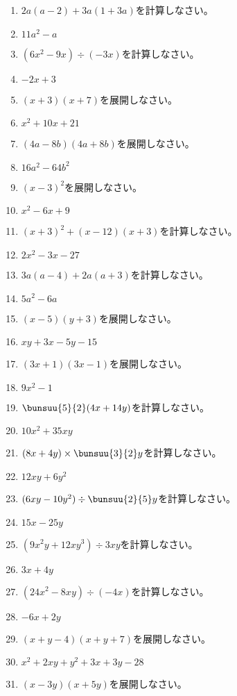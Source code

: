 \documentclass[uplatex,a4j,11pt]{jsreport}
\begin{document}
\begin{multicols}{2}
\begin{enumerate}
    \item $2a(a-2)+3a(1+3a)$\quad を計算しなさい。%
    \item $11a^2-a$
    \item $(6x^2-9x)\div (-3x)$\quad を計算しなさい。%
    \item $-2x+3$
    \item $(x+3)(x+7)$\quad を展開しなさい。%
    \item $x^2+10x+21$
    \item $(4a-8b)(4a+8b)$\quad を展開しなさい。%
    \item $16a^2-64b^2$
    \item $(x-3)^2$\quad を展開しなさい。%
    \item $x^2-6x+9$
    \item $(x+3)^2+(x-12)(x+3)$\quad を計算しなさい。%
    \item $2x^2-3x-27$
    \item $3a(a-4)+2a(a+3)$\quad を計算しなさい。%
    \item $5a^2-6a$
    \item $(x-5)(y+3)$\quad を展開しなさい。%
    \item $xy+3x-5y-15$
    \item $(3x+1)(3x-1)$\quad を展開しなさい。%
    \item $9x^2-1$
    \item $\bunsuu{5}{2}(4x+14y)$\quad を計算しなさい。%
    \item $10x^2+35xy$
    \item $(8x+4y)\times \bunsuu{3}{2}y$\quad を計算しなさい。%
    \item $12xy+6y^2$
    \item $(6xy-10y^2)\div \bunsuu{2}{5}y$\quad を計算しなさい。%
    \item $15x-25y$
    \item $(9x^2y+12xy^3)\div 3xy$\quad を計算しなさい。%
    \item $3x+4y$
    \item $(24x^2-8xy)\div (-4x)$\quad を計算しなさい。%
    \item $-6x+2y$
    \item $(x+y-4)(x+y+7)$\quad を展開しなさい。%
    \item $x^2+2xy+y^2+3x+3y-28$
    \item $(x-3y)(x+5y)$\quad を展開しなさい。%

\end{enumerate}
\end{multicols}
\end{document}
